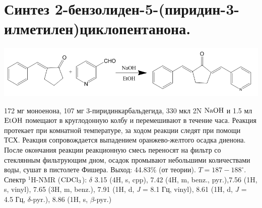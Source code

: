 \documentclass[a4paper]{article}
\begin{document}
\section{Синтез 2-бензолиден-5-(пиридин-3-илметилен)циклопентанона.}
\begin{center}
\includegraphics[scale=0.35]{pictures/3.png}
\end{center}
172 мг моноенона, 107 мг 3-пиридинкарбальдегида, 330 мкл 2N $\ce{NaOH}$ и 1.5 мл $\ce{EtOH}$ помещают в круглодонную колбу и перемешивают в течение часа. Реакция протекает при комнатной температуре, за ходом реакции следят при помощи ТСХ. Реакция сопровождается выпадением оранжево-желтого осадка диенона. После окончания реакции реакционную смесь переносят на фильтр со стеклянным фильтрующим дном, осадок промывают небольшими количествами воды, сушат в пистолете Фишера.
Выход: 44.83$\%$ (от теории). $T = 187-188^{\circ}$. \\
Спектр $^{1}$H-NMR ($\ce{CDCl3}$): $\delta$ 3.15 (4H, s, cpp), 7.42 (4H, m, benz., pyr.),7.56 (1H, s, vinyl), 7.65 (3H, m, benz.), 7.91 (1H, d, \textit{J} = 8.1 Гц, vinyl), 8.61 (1H, d, \textit{J} = 4.5 Гц, $\delta$-pyr.), 8.86 (1H, s, $\beta$-pyr.)
\end{document}

